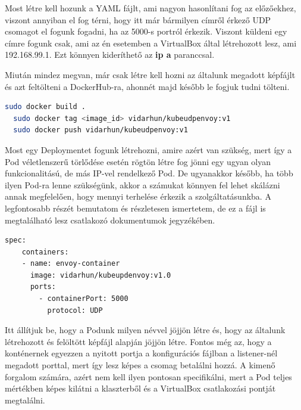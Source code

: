 \documentclass[a4paper,oneside]{article}
\begin{document}
Most létre kell hozunk a YAML fájlt, ami nagyon hasonlítani fog az előzőekhez,
viszont annyiban el fog térni, hogy itt már bármilyen címről érkező UDP csomagot
el fogunk fogadni, ha az 5000-s portról érkezik. Viszont küldeni egy címre fogunk
csak, ami az én esetemben a VirtualBox által létrehozott lesz, ami 192.168.99.1.
Ezt könnyen kideríthető az \textbf{ip a} paranccsal.

Miután mindez megvan, már csak létre kell hozni az általunk megadott képfájlt és
azt feltölteni a DockerHub-ra, ahonnét majd később le fogjuk tudni tölteni.
\begin{lstlisting}[language=bash]
  sudo docker build .
  sudo docker tag <image_id> vidarhun/kubeudpenvoy:v1
  sudo docker push vidarhun/kubeudpenvoy:v1
\end{lstlisting}
Most egy Deploymentet fogunk létrehozni, amire azért van szükség, mert így
a Pod véletlenszerű törlődése esetén rögtön létre fog jönni egy ugyan olyan
funkcionalitású, de más IP-vel rendelkező Pod. De ugyanakkor később, ha több
ilyen Pod-ra lenne szükségünk, akkor a számukat könnyen fel lehet skálázni
annak megfelelően, hogy mennyi terhelése érkezik a szolgáltatásunkba.
A legfontosabb részét bemutatom és részletesen ismertetem, de ez a fájl is
megtalálható lesz csatlakozó dokumentumok jegyzékében.
\begin{lstlisting}[language=bash]
  spec:
    containers:
    - name: envoy-container
      image: vidarhun/kubeupdenvoy:v1.0
      ports:
        - containerPort: 5000
          protocol: UDP
\end{lstlisting}
Itt állítjuk be, hogy a Podunk milyen névvel jöjjön létre és, hogy az
általunk létrehozott és felöltött képfájl alapján jöjjön létre.
Fontos még az, hogy a konténernek egyezzen a nyitott portja a konfigurációs
fájlban a listener-nél megadott porttal, mert így lesz képes a csomag betalálni
hozzá. A kimenő forgalom számára, azért nem kell ilyen pontosan specifikálni,
mert a Pod teljes mértékben képes kilátni a klaszterből és a VirtualBox
csatlakozási pontját megtalálni.
\end{document}

